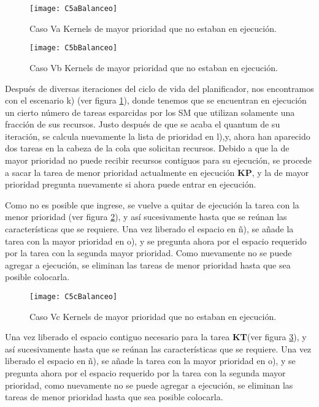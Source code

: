     \begin{figure}[!]
      \centering
        \texttt{[image: C5aBalanceo]}
        \caption{Caso Va Kernels de mayor prioridad que no estaban en ejecución.}
        \label{fig:C5aBalanceo}
    \end{figure}
    
    \begin{figure}[!]
      \centering
        \texttt{[image: C5bBalanceo]}
        \caption{Caso Vb Kernels de mayor prioridad que no estaban en ejecución.}
        \label{fig:C5bBalanceo}
    \end{figure}
    
    Después de diversas iteraciones del ciclo de vida del planificador, nos encontramos con el escenario k) (ver figura \ref{fig:C5aBalanceo}), donde tenemos que se encuentran en ejecución un cierto número de tareas esparcidas por los SM que utilizan solamente una fracción de sus recursos. Justo después de que se acaba el quantum de su iteración, se calcula nuevamente la lista de prioridad en l),y, ahora han aparecido dos tareas en la cabeza de la cola que solicitan recursos.
    Debido a que la de mayor prioridad no puede recibir recursos contiguos para su ejecución, se procede a sacar la tarea de menor prioridad actualmente en ejecución \textbf{KP}, y la de mayor prioridad pregunta nuevamente si ahora puede entrar en ejecución.
\newline

    Como no es posible que ingrese, se vuelve a quitar de ejecución la tarea con la menor prioridad (ver figura  \ref{fig:C5bBalanceo}), y así sucesivamente hasta que se reúnan las características que se requiere. Una vez liberado el espacio en ñ), se añade la tarea con la mayor prioridad en o), y se pregunta ahora por el espacio requerido por la tarea con la segunda mayor prioridad. Como nuevamente no se puede agregar a ejecución, se eliminan las tareas de menor prioridad hasta que sea posible colocarla.
\newline

    \begin{figure}[!]
      \centering
        \texttt{[image: C5cBalanceo]}
        \caption{Caso Vc Kernels de mayor prioridad que no estaban en ejecución.}
        \label{fig:C5cBalanceo}
    \end{figure}

    Una vez liberado el espacio contiguo necesario para la tarea \textbf{KT}(ver figura  \ref{fig:C5cBalanceo}), y así sucesivamente hasta que se reúnan las características que se requiere. Una vez liberado el espacio en ñ), se añade la tarea con la mayor prioridad en o), y se pregunta ahora por el espacio requerido por la tarea con la segunda mayor prioridad, como nuevamente no se puede agregar a ejecución, se eliminan las tareas de menor prioridad hasta que sea posible colocarla.
\newline
    

